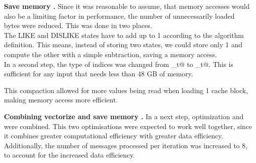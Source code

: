 \documentclass[letterpaper]{article}
\newcommand{\mypar}[1]{{\bf #1.}}
\begin{document}

\mypar{Save memory }
Since it was reasonable to assume, that memory accesses would also be a limiting factor in performance, the number of unnecessarily loaded bytes were reduced. This was done in two places.\\
The LIKE and DISLIKE states have to add up to 1 according to the algorithm definition. This means, instead of storing two states, we could store only 1 and compute the other with a simple subtraction, saving a memory access.\\
In a second step, the type of indices was changed from \verb@size_t@ to _t@. This is sufficient for any input that needs less than 48 GB of memory. 

This compaction allowed for more values being read when loading 1 cache block, making memory access more efficient.


\mypar{Combining vectorize and save memory }
In a next step, optimization  and  were combined. This two optimisations were expected to work well together, since it combines greater computational efficiency with greater data efficiency. Additionally, the number of messages processed per iteration was increased to 8, to account for the increased data efficiency.
\end{document}

